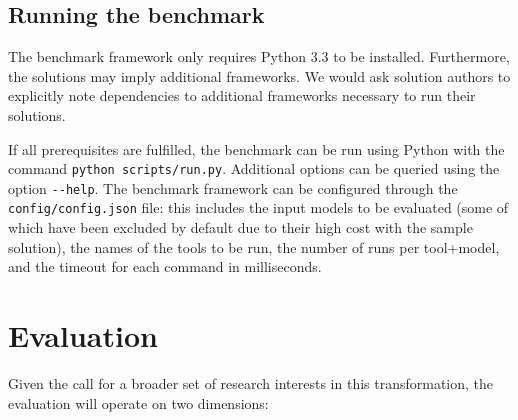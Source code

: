 \documentclass[a4paper]{scrartcl}
\newcommand*{\file}[1]{\texttt{#1}}
\begin{document}
\subsection{Running the benchmark}
\label{sec:running-benchmark}

The benchmark framework only requires Python 3.3 to be installed. Furthermore,
the solutions may imply additional frameworks. We would ask solution authors to
explicitly note dependencies to additional frameworks necessary to run their
solutions.

If all prerequisites are fulfilled, the benchmark can be run using Python with
the command \file{python scripts/run.py}. Additional options can be queried
using the option \file{{-}{-}help}. The benchmark framework can be configured
through the \file{config/config.json} file: this includes the input models to be
evaluated (some of which have been excluded by default due to their high cost with the sample solution), the names of the tools to be run, the number of runs per tool+model, and the timeout for each command in milliseconds.

\section{Evaluation}
\label{sec:evaluation}

Given the call for a broader set of research interests in this transformation,
the evaluation will operate on two dimensions:
\end{document}
